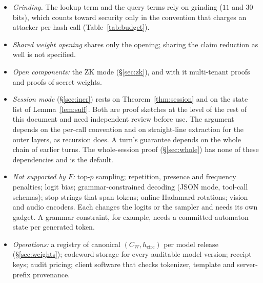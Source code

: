 \documentclass[11pt]{article}
\begin{document}
\begin{itemize}
\item \emph{Grinding.} The lookup term and the query terms rely on grinding (\(11\) and \(30\) bits), which counts toward security only in the convention that charges an attacker per hash call (Table~\ref{tab:budget}).
\item \emph{Shared weight opening} shares only the opening; sharing the claim reduction as well is not specified.
\item \emph{Open components:} the ZK mode (\S\ref{sec:zk}), and with it multi-tenant proofs and proofs of secret weights.
\item \emph{Session mode} (\S\ref{sec:incr}) rests on Theorem~\ref{thm:session} and on the state list of Lemma~\ref{lem:suff}. Both are proof sketches at the level of the rest of this document and need independent review before use. The argument depends on the per-call convention and on straight-line extraction for the outer layers, as recursion does. A turn's guarantee depends on the whole chain of earlier turns. The whole-session proof (\S\ref{sec:whole}) has none of these dependencies and is the default.
\item \emph{Not supported by \(F\):} top-\(p\) sampling; repetition, presence and frequency penalties; logit bias; grammar-constrained decoding (JSON mode, tool-call schemas); stop strings that span tokens; online Hadamard rotations; vision and audio encoders. Each changes the logits or the sampler and needs its own gadget. A grammar constraint, for example, needs a committed automaton state per generated token.
\item \emph{Operations:} a registry of canonical \((C_W, h_{\mathrm{circ}})\) per model release (\S\ref{sec:weights}); codeword storage for every auditable model version; receipt keys; audit pricing; client software that checks tokenizer, template and server-prefix provenance.
\end{itemize}
\end{document}
